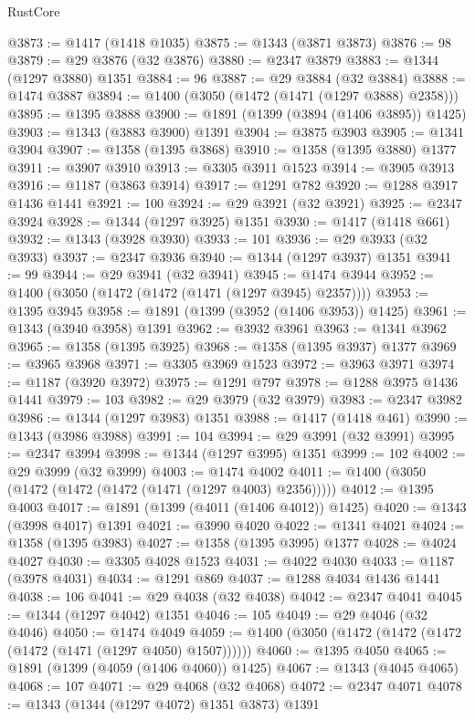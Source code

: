\begin{lexlean}{RustCore}
\begin{coremodule}
@3873 := @1417 (@1418 @1035)
@3875 := @1343 (@3871 @3873)
@3876 := 98
@3879 := @29 @3876 (@32 @3876)
@3880 := @2347 @3879
@3883 := @1344 (@1297 @3880) @1351
@3884 := 96
@3887 := @29 @3884 (@32 @3884)
@3888 := @1474 @3887
@3894 := @1400 (@3050 (@1472 (@1471 (@1297 @3888) @2358)))
@3895 := @1395 @3888
@3900 := @1891 (@1399 (@3894 (@1406 @3895)) @1425)
@3903 := @1343 (@3883 @3900) @1391
@3904 := @3875 @3903
@3905 := @1341 @3904
@3907 := @1358 (@1395 @3868)
@3910 := @1358 (@1395 @3880) @1377
@3911 := @3907 @3910
@3913 := @3305 @3911 @1523
@3914 := @3905 @3913
@3916 := @1187 (@3863 @3914)
@3917 := @1291 @782
@3920 := @1288 @3917 @1436 @1441
@3921 := 100
@3924 := @29 @3921 (@32 @3921)
@3925 := @2347 @3924
@3928 := @1344 (@1297 @3925) @1351
@3930 := @1417 (@1418 @661)
@3932 := @1343 (@3928 @3930)
@3933 := 101
@3936 := @29 @3933 (@32 @3933)
@3937 := @2347 @3936
@3940 := @1344 (@1297 @3937) @1351
@3941 := 99
@3944 := @29 @3941 (@32 @3941)
@3945 := @1474 @3944
@3952 := @1400 (@3050 (@1472 (@1472 (@1471 (@1297 @3945) @2357))))
@3953 := @1395 @3945
@3958 := @1891 (@1399 (@3952 (@1406 @3953)) @1425)
@3961 := @1343 (@3940 @3958) @1391
@3962 := @3932 @3961
@3963 := @1341 @3962
@3965 := @1358 (@1395 @3925)
@3968 := @1358 (@1395 @3937) @1377
@3969 := @3965 @3968
@3971 := @3305 @3969 @1523
@3972 := @3963 @3971
@3974 := @1187 (@3920 @3972)
@3975 := @1291 @797
@3978 := @1288 @3975 @1436 @1441
@3979 := 103
@3982 := @29 @3979 (@32 @3979)
@3983 := @2347 @3982
@3986 := @1344 (@1297 @3983) @1351
@3988 := @1417 (@1418 @461)
@3990 := @1343 (@3986 @3988)
@3991 := 104
@3994 := @29 @3991 (@32 @3991)
@3995 := @2347 @3994
@3998 := @1344 (@1297 @3995) @1351
@3999 := 102
@4002 := @29 @3999 (@32 @3999)
@4003 := @1474 @4002
@4011 := @1400 (@3050 (@1472 (@1472 (@1472 (@1471 (@1297 @4003) @2356)))))
@4012 := @1395 @4003
@4017 := @1891 (@1399 (@4011 (@1406 @4012)) @1425)
@4020 := @1343 (@3998 @4017) @1391
@4021 := @3990 @4020
@4022 := @1341 @4021
@4024 := @1358 (@1395 @3983)
@4027 := @1358 (@1395 @3995) @1377
@4028 := @4024 @4027
@4030 := @3305 @4028 @1523
@4031 := @4022 @4030
@4033 := @1187 (@3978 @4031)
@4034 := @1291 @869
@4037 := @1288 @4034 @1436 @1441
@4038 := 106
@4041 := @29 @4038 (@32 @4038)
@4042 := @2347 @4041
@4045 := @1344 (@1297 @4042) @1351
@4046 := 105
@4049 := @29 @4046 (@32 @4046)
@4050 := @1474 @4049
@4059 := @1400 (@3050 (@1472 (@1472 (@1472 (@1472 (@1471 (@1297 @4050) @1507))))))
@4060 := @1395 @4050
@4065 := @1891 (@1399 (@4059 (@1406 @4060)) @1425)
@4067 := @1343 (@4045 @4065)
@4068 := 107
@4071 := @29 @4068 (@32 @4068)
@4072 := @2347 @4071
@4078 := @1343 (@1344 (@1297 @4072) @1351 @3873) @1391

\end{coremodule}
\end{lexlean}
